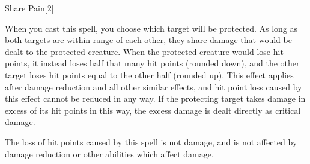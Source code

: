 \begin{spellsection}{Share Pain}[2]
    \begin{spellheader}
    \end{spellheader}
    \begin{spellcontent}
        \begin{spelltargetinginfo}
        \end{spelltargetinginfo}
        \begin{spelleffects}
            \spellspecial When you cast this spell, you choose which target will be protected.
            \spelleffect As long as both targets are within \rngmed range of each other, they share damage that would be dealt to the protected creature.
            When the protected creature would lose hit points, it instead loses half that many hit points (rounded down), and the other target loses hit points equal to the other half (rounded up).
            This effect applies after damage reduction and all other similar effects, and hit point loss caused by this effect cannot be reduced in any way.
            If the protecting target takes damage in excess of its hit points in this way, the excess damage is dealt directly as critical damage.
            \spelldur \durshort \dismissable
        \end{spelleffects}
    \end{spellcontent}
    \begin{spellfooter}
        \spellnotes The loss of hit points caused by this spell is not damage, and is not affected by damage reduction or other abilities which affect damage.
        \miscastexplode
    \end{spellfooter}
    \begin{spellaugments}
    \end{spellaugments}
\end{spellsection}

